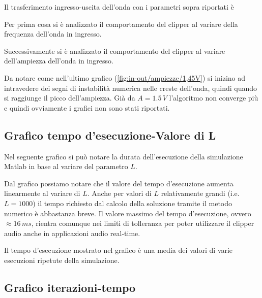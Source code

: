			Il trasferimento ingresso-uscita dell'onda con i parametri sopra riportati è
			\pagebreak
		
			Per prima cosa si è analizzato il comportamento del clipper al variare della frequenza dell'onda in ingresso.
		
			Successivamente si è analizzato il comportamento del clipper al variare dell'ampiezza dell'onda in ingresso.
			
			Da notare come nell'ultimo grafico (\ref{fig:in-out/ampiezze/1,45V}) si inizino ad intravedere dei segni di instabilità numerica nelle creste dell'onda, quindi quando si raggiunge il picco dell'ampiezza. Già da $A = 1.5\,V$ l'algoritmo non converge più e quindi ovviamente i grafici non sono stati riportati.
		
		\subsection{Grafico tempo d'esecuzione-Valore di L}
			Nel seguente grafico si può notare la durata dell'esecuzione della simulazione Matlab in base al variare del parametro $L$.
			
			Dal grafico possiamo notare che il valore del tempo d'esecuzione aumenta linearmente al variare di $L$. Anche per valori di $L$ relativamente grandi (i.e. $L = 1000$) il tempo richiesto dal calcolo della soluzione tramite il metodo numerico è abbastanza breve. Il valore massimo del tempo d'esecuzione, ovvero $\approx 16\,ms$, rientra comunque nei limiti di tolleranza per poter utilizzare il clipper audio anche in applicazioni audio real-time.
			
			Il tempo d'esecuzione mostrato nel grafico è una media dei valori di varie esecuzioni ripetute della simulazione.
		
		\subsection{Grafico iterazioni-tempo}
